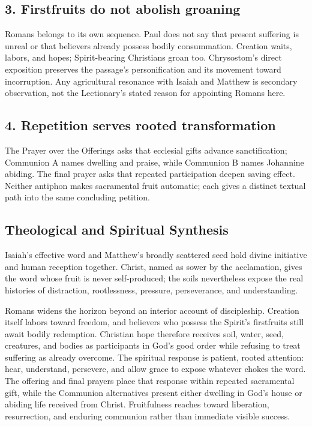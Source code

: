 \begin{deepstudy}
\subsection*{3. Firstfruits do not abolish groaning\enspace{}}

Romans belongs to its own sequence. Paul does not say that present suffering is unreal or that believers already possess bodily consummation. Creation waits, labors, and hopes; Spirit-bearing Christians groan too. Chrysostom's direct exposition preserves the passage's personification and its movement toward incorruption. Any agricultural resonance with Isaiah and Matthew is secondary observation, not the Lectionary's stated reason for appointing Romans here.

\subsection*{4. Repetition serves rooted transformation\enspace{}}

The Prayer over the Offerings asks that ecclesial gifts advance sanctification; Communion A names dwelling and praise, while Communion B names Johannine abiding. The final prayer asks that repeated participation deepen saving effect. Neither antiphon makes sacramental fruit automatic; each gives a distinct textual path into the same concluding petition.

\clearpage
\subsection*{Theological and Spiritual Synthesis}

Isaiah's effective word and Matthew's broadly scattered seed hold divine initiative and human reception together. Christ, named as sower by the acclamation, gives the word whose fruit is never self-produced; the soils nevertheless expose the real histories of distraction, rootlessness, pressure, perseverance, and understanding.

Romans widens the horizon beyond an interior account of discipleship. Creation itself labors toward freedom, and believers who possess the Spirit's firstfruits still await bodily redemption. Christian hope therefore receives soil, water, seed, creatures, and bodies as participants in God's good order while refusing to treat suffering as already overcome.
The spiritual response is patient, rooted attention: hear, understand, persevere, and allow grace to expose whatever chokes the word. The offering and final prayers place that response within repeated sacramental gift, while the Communion alternatives present either dwelling in God's house or abiding life received from Christ. Fruitfulness reaches toward liberation, resurrection, and enduring communion rather than immediate visible success.


\end{deepstudy}
